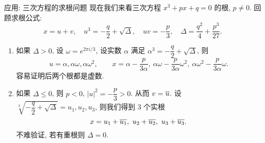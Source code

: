 \begin{frame}{应用: 三次方程的求根问题\noexer}
	\onslide<+->
	现在我们来看三次方程 $x^3+px+q=0$ 的根, $p\neq 0$.
	\onslide<+->
	回顾求根公式:
	\[x=u+v,\quad u^3=-\frac q2+\sqrt{\Delta},\quad uv=-\frac p3,\quad \Delta=\frac{q^2}4+\frac{p^3}{27}.\]
	\vspace{-\baselineskip}
	\begin{enumerate}
		\item 如果 $\Delta>0$, 设 $\omega=e^{2\pi i/3}$, 设实数 $\alpha$ 满足 $\alpha^3=-\dfrac q2+\sqrt{\Delta}$,
			\onslide<+->
			则
				\[
					u=\alpha,\alpha\omega,\alpha\omega^2,\qquad
					x=\alpha-\frac p{3\alpha},\ 
						\alpha\omega-\frac p{3\alpha} \omega^2,\ 
						\alpha\omega^2-\frac p{3\alpha} \omega.
				\]
			\onslide<+->
			容易证明后两个根都是虚数.
		\item 如果 $\Delta\le 0$, 则 $p<0$, $|u|^2=-\dfrac p3>0$. 
			\onslide<+->
			从而 $v=\overline u$.
			\onslide<+->
			设 $\sqrt[3]{-\dfrac q2+\sqrt{\Delta}}=u_1,u_2,u_3$,
			\onslide<+->
			则我们得到 $3$ 个实根
				\[x=u_1+\ov{u_1},\ u_2+\ov{u_2},\ u_3+\ov{u_3}.\]
			\onslide<+->
			不难验证, 若有重根则 $\Delta=0$.
	\end{enumerate}
\end{frame}

